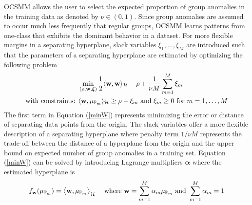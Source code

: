OCSMM allows the user to select the expected proportion of group anomalies in the training data as denoted by  $\nu \in (0,1)$.  Since group anomalies are assumed to occur much less frequently that regular groups,  OCSMM learns patterns from one-class that exhibits  the dominant behavior in a dataset.  
For more flexible margins in a separating hyperplane, 
slack variables $\xi_1,\dots,\xi_M$ are  introduced such that the parameters  of a separating hyperplane are estimated by optimizing the following problem %
 \begin{align}
&\min_{(  \rho, {\bf w},\boldsymbol \xi)} 
\frac{1}{2} \langle {\bf w},{\bf w} \rangle_{\small \mathcal{H}} - \rho +  \frac{1}{\nu M} \sum_{m=1}^M
\xi_m  \label{minW} \\
\mbox{with con}\mbox{straints: } &  \langle {\bf w} ,  \mu_{\mathbb{P}_m } \rangle_\mathcal{H} \ge \rho - \xi_m \mbox{ and } \xi_m \ge 0 \mbox{ for } m=1,\dots,M   \nonumber
\end{align}
 The first term in Equation (\ref{minW}) represents  minimizing the error or distance of separating data points from the origin. The slack variables offer a more flexible description of a separating hyperplane where penalty term $1/{\nu M}$ represents the trade-off between the distance of a hyperplane from the origin and the upper bound on expected number of group anomalies in a training set. 
Equation (\ref{minW}) can be solved by introducing Lagrange multipliers $\boldsymbol \alpha$ where the estimated hyperplane is %
\begin{align*}
 f_{\bf w}(\mu_{\mathbb{P}_m } ) = \big\langle {\bf w},\mu_{\mathbb{P}_m } \big \rangle_\mathcal{H} \quad %
\mbox{ where }{\bf w}= \sum_{m=1}^M \alpha_m  \mu_{\mathbb{P}_m} \mbox{ and } \sum_{m=1}^M \alpha_m=1
\end{align*} 
 
